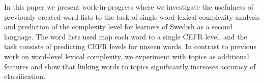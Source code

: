 In this paper we present work-in-progress where we investigate the usefulness of previously created word lists to the task of single-word lexical complexity analysis and prediction of the complexity level for learners of Swedish as a second language. The word lists used map each word to a single CEFR level, and the task consists of predicting CEFR levels for unseen words. In contrast to previous work on word-level lexical complexity, we experiment with topics as additional features and show that linking words to topics significantly increases accuracy of classification.
